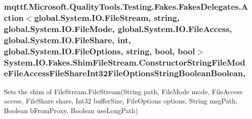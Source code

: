 \hypertarget{class_system_1_1_i_o_1_1_fakes_1_1_shim_file_stream_a87c427a6d75e0bee781c975e9bbe4769}{
\subsubsection[{Constructor\-String\-File\-Mode\-File\-Access\-File\-Share\-Int32\-File\-Options\-String\-Boolean\-Boolean}]{\setlength{\rightskip}{0pt plus 5cm}mqttf.\-Microsoft.\-Quality\-Tools.\-Testing.\-Fakes.\-Fakes\-Delegates.\-Action$<$global.\-System.\-I\-O.\-File\-Stream, string, global.\-System.\-I\-O.\-File\-Mode, global.\-System.\-I\-O.\-File\-Access, global.\-System.\-I\-O.\-File\-Share, int, global.\-System.\-I\-O.\-File\-Options, string, bool, bool$>$ System.\-I\-O.\-Fakes.\-Shim\-File\-Stream.\-Constructor\-String\-File\-Mode\-File\-Access\-File\-Share\-Int32\-File\-Options\-String\-Boolean\-Boolean\hspace{0.3cm}{\ttfamily [static]}, {\ttfamily [set]}}}\label{class_system_1_1_i_o_1_1_fakes_1_1_shim_file_stream_a87c427a6d75e0bee781c975e9bbe4769}


Sets the shim of File\-Stream.\-File\-Stream(\-String path, File\-Mode mode, File\-Access access, File\-Share share, Int32 buffer\-Size, File\-Options options, String msg\-Path, Boolean b\-From\-Proxy, Boolean use\-Long\-Path)

